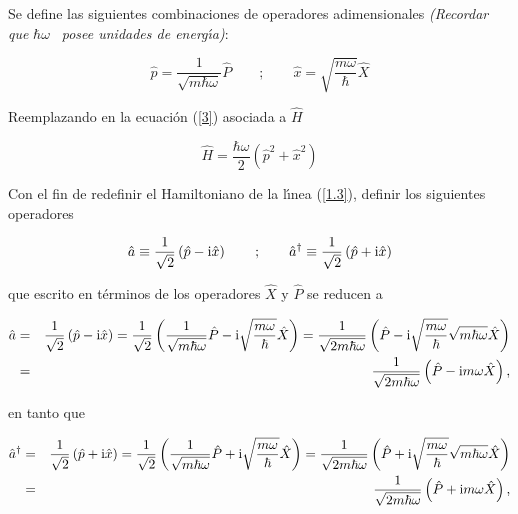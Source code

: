 \newcommand{\Op}{\hat{p}}
\newcommand{\Ox}{\hat{x}}
\newcommand{\OP}{\hat{P}}
\newcommand{\OX}{\hat{X}}

\begin{solution}
Se define las siguientes combinaciones de operadores adimensionales \emph{(Recordar que} $\hbar \omega$ \emph{\ posee unidades de energ\'{\i}a)}:

\begin{equation*}
\hat{p}=\frac{1}{\sqrt{m\hbar \omega }}\OP \qquad ;\qquad  \hat{x}=\sqrt{\frac{m\omega }{\hbar}}\OX
\end{equation*}

Reemplazando en la ecuaci\'{o}n (\ref{3}) asociada a $\hat{H}$

\begin{equation}
\hat{H}=\frac{\hbar \omega }{2}\left( \Op^{2}+\Ox^{2}\right)  \label{1.3}
\end{equation}

Con el fin de redefinir el Hamiltoniano de la l\'{\i}nea (\ref{1.3}), definir los siguientes operadores

\begin{equation}
\Oaa \equiv \frac{1}{\sqrt{2}}\left( \Op-\ii \Ox \right) \qquad ;\qquad \Oaa^{\dagger } \equiv \frac{1}{\sqrt{2}}\left( \Op+\ii \Ox\right)  \label{1.3A}
\end{equation}

que escrito en t\'{e}rminos de los operadores $\OX$ y \thinspace $\OP$ se reducen a

\begin{eqnarray*}
\Oaa &=&\frac{1}{\sqrt{2}}\left( \Op-\ii \Ox \right) =\frac{1}{\sqrt{2}}\left( \frac{1}{\sqrt{m\hbar \omega }} \OP- \ii \sqrt{\frac{m\omega }{\hbar }}\OX \right) =\frac{1}{\sqrt{2m\hbar \omega }}\left( \OP-\ii \sqrt{\frac{m\omega}{\hbar}}\sqrt{m\hbar \omega} \OX \right) \\
&=&\frac{1}{\sqrt{2m\hbar \omega }}\left( \OP-\ii m\omega \OX \right),
\end{eqnarray*}

en tanto que

\begin{eqnarray*}
\Oaa^{\dagger } &=& \frac{1}{\sqrt{2}}\left( \Op+ \ii \Ox\right) =\frac{1}{\sqrt{2}}\left( \frac{1}{\sqrt{m\hbar \omega }} \OP + \ii \sqrt{\frac{m\omega }{\hbar}} \OX \right) =\frac{1}{\sqrt{2m\hbar \omega }}\left( \OP+\ii \sqrt{\frac{m\omega}{\hbar}}\sqrt{m\hbar \omega } \OX \right) \\
&=&\frac{1}{\sqrt{2m\hbar \omega }}\left( \OP+\ii m\omega \OX \right), 
\end{eqnarray*}


\end{solution}
